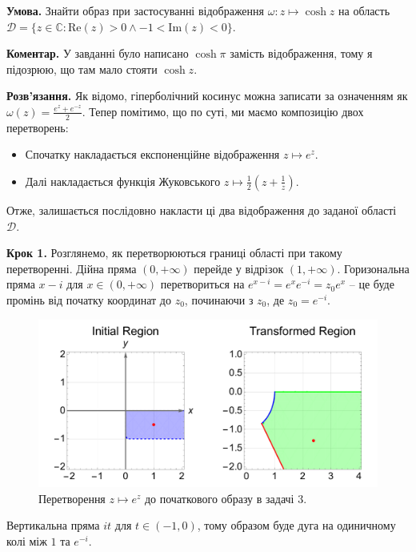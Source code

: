 \documentclass[oneside,solution]{karazin-complan-assign}
\begin{document}

\hspace{20px}\textbf{Умова.} Знайти образ при застосуванні відображення $\omega: z \mapsto \cosh z$ на область $\mathcal{D} = \{z \in \mathbb{C}: \text{Re}(z) > 0 \wedge -1 < \text{Im}(z) < 0\}$.

\textbf{Коментар.} У завданні було написано $\cosh \pi$ замість відображення, тому я підозрюю, що там мало стояти $\cosh z$.

\textbf{Розв'язання.} Як відомо, гіперболічний косинус можна записати за означенням як $\omega(z)=\frac{e^z + e^{-z}}{2}$. Тепер помітимо, що по суті, ми маємо композицію двох перетворень:
\begin{itemize}
    \item Спочатку накладається експоненційне відображення $z \mapsto e^z$.
    \item Далі накладається функція Жуковського $z \mapsto \frac{1}{2}\left(z+\frac{1}{z}\right)$.
\end{itemize}

Отже, залишається послідовно накласти ці два відображення до заданої області $\mathcal{D}$.

\textbf{Крок 1.} Розглянемо, як перетворюються границі області при такому перетворенні. Дійна пряма $(0,+\infty)$ перейде у відрізок $(1,+\infty)$. Горизональна пряма $x-i$ для $x \in (0,+\infty)$ перетвориться на $e^{x-i}=e^xe^{-i} = z_0e^x$ -- це буде промінь від початку координат до $z_0$, починаючи з $z_0$, де $z_0=e^{-i}$. 

\begin{figure}
    \centering
    \includegraphics[width=\textwidth]{images/test_2/plot_3_1.pdf}
    \caption{Перетворення $z \mapsto e^z$ до початкового образу в задачі 3.}
    \label{fig:3(1)}
\end{figure}

Вертикальна пряма $it$ для $t \in (-1,0)$, тому образом буде дуга на одиничному колі між $1$ та $e^{-i}$. 
\end{document}
